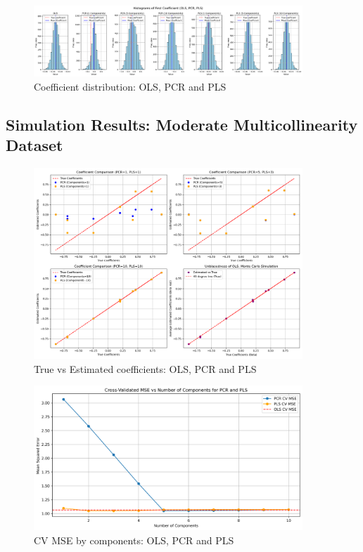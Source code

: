\documentclass[11pt,twoside,a4paper]{article}
\begin{document}
\begin{figure}[H]
    \centering
    \includegraphics[width=0.9\textwidth]{Fourth_plot.png}
    \caption{Coefficient distribution: OLS, PCR and PLS}
    \label{fig:Classic_data_analysis}
\end{figure}

\subsection{Simulation Results: Moderate Multicollinearity Dataset}

\begin{figure}[H]
    \centering
    \includegraphics[width=0.9\textwidth]{First_plot_second_simulation.png}
    \caption{True vs Estimated coefficients: OLS, PCR and PLS}
    \label{fig:Moderate_multicollinear_data_analysis}
\end{figure}

\begin{figure}[H]
    \centering
    \includegraphics[width=0.9\textwidth]{Second_plot_second_simulation.png}
    \caption{CV MSE by components: OLS, PCR and PLS}
    \label{fig:Moderate_multicollinear_data_analysis}
\end{figure}
\end{document}
